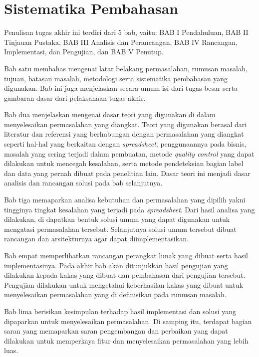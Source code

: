 \section{Sistematika Pembahasan}

Penulisan tugas akhir ini terdiri dari 5 bab, yaitu: BAB I Pendahuluan, BAB II Tinjauan Pustaka, BAB III Analisis dan Perancangan, BAB IV Rancangan, Implementasi, dan Pengujian, dan BAB V Penutup.

Bab satu membahas mengenai latar belakang permasalahan, rumusan masalah, tujuan, batasan masalah, metodologi serta sistematika pembahasan yang digunakan. Bab ini juga menjelaskan secara umum isi dari tugas besar serta gambaran dasar dari pelaksanaan tugas akhir.

Bab dua menjelaskan mengenai dasar teori yang digunakan di dalam menyelesaikan permasalahan yang diangkat. Teori yang digunakan berasal dari literatur dan referensi yang berhubungan dengan permasalahan yang diangkat seperti hal-hal yang berkaitan dengan \textit{spreadsheet}, penggunaannya pada bisnis, masalah yang sering terjadi dalam pembuatan, metode \textit{quality control} yang dapat dilakukan untuk mencegah kesalahan, serta metode pendeteksian bagian label dan data yang pernah dibuat pada penelitian lain. Dasar teori ini menjadi dasar analisis dan rancangan solusi pada bab selanjutnya.

Bab tiga memaparkan analisa kebutuhan dan permasalahan yang dipilih yakni tingginya tingkat kesalahan yang terjadi pada \textit{spreadsheet}. Dari hasil analisa yang dilakukan, di dapatkan bentuk solusi umum yang dapat digunakan untuk mengatasi permasalahan tersebut. Selanjutnya solusi umum tersebut dibuat rancangan dan arsitekturnya agar dapat diimplementasikan.

Bab empat memperlihatkan rancangan perangkat lunak yang dibuat serta hasil implementasinya. Pada akhir bab akan ditunjukkan hasil pengujian yang dilakukan kepada kakas yang dibuat dan pembahasan dari pengujian tersebut. Pengujian dilakukan untuk mengetahui keberhasilan kakas yang dibuat untuk menyelesaikan permasalahan yang di definisikan pada rumusan masalah.

Bab lima berisikan kesimpulan terhadap hasil implementasi dan solusi yang dipaparkan untuk menyelesaikan permasalahan. Di samping itu, terdapat bagian saran yang memaparkan saran pengembangan dan perbaikan yang dapat dilakukan untuk memperkaya fitur dan menyelesaikan permasalahan yang lebih luas.


